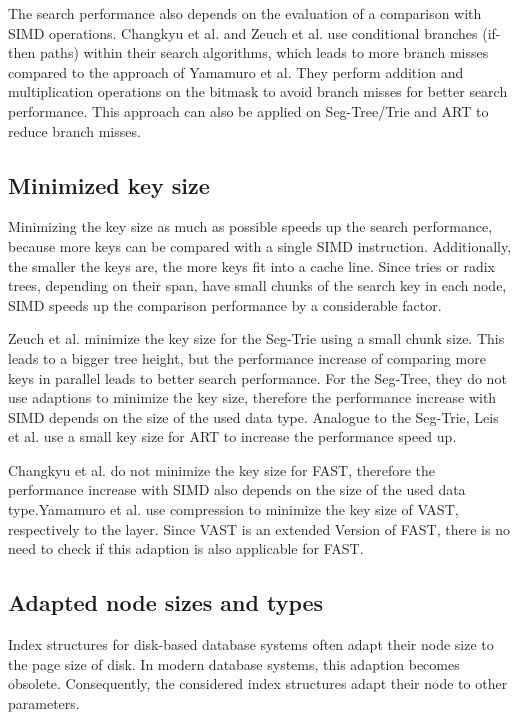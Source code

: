 \documentclass[conference]{IEEEtran}
\begin{document}
The search performance also depends on the evaluation of a comparison with SIMD operations. Changkyu et al. and Zeuch et al. use conditional branches (if-then paths) within their search algorithms, which leads to more branch misses compared to the approach of Yamamuro et al. They perform addition and multiplication operations on the bitmask to avoid branch misses for better search performance. This approach can also be applied on Seg-Tree/Trie and ART to reduce branch misses.

\subsection{Minimized key size}
Minimizing the key size as much as possible speeds up the search performance, because more keys can be compared with a single SIMD instruction. Additionally, the smaller the keys are, the more keys fit into a cache line. Since tries or radix trees, depending on their span, have small chunks of the search key in each node, SIMD speeds up the comparison performance by a considerable factor.  

Zeuch et al. minimize the key size for the Seg-Trie using a small chunk size. This leads to a bigger tree height, but the performance increase of comparing more keys in parallel leads to better search performance. For the Seg-Tree, they do not use adaptions to minimize the key size, therefore the performance increase with SIMD depends on the size of the used data type. Analogue to the Seg-Trie, Leis et al. use a small key size for ART to increase the performance speed up.

Changkyu et al. do not minimize the key size for FAST, therefore the performance increase with SIMD also depends on the size of the used data type.Yamamuro et al. use compression to minimize the key size of VAST, respectively to the layer. Since VAST is an extended Version of FAST, there is no need to check if this adaption is also applicable for FAST. 


\subsection{Adapted node sizes and types}
Index structures for disk-based database systems often adapt their node size to the page size of disk. In modern database systems, this adaption becomes obsolete. Consequently, the considered index structures adapt their node to other parameters. 
\end{document}
